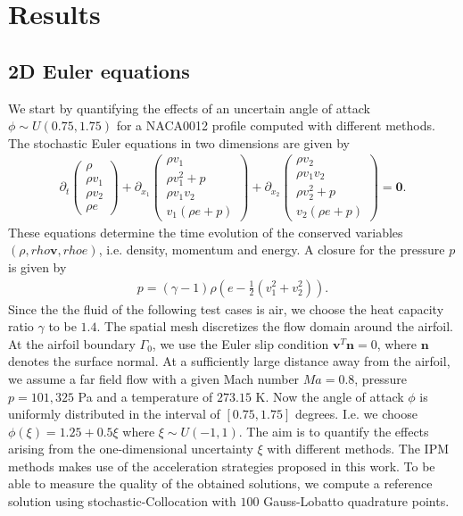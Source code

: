 \section{Results}
\label{sec:results}

\subsection{2D Euler equations}
We start by quantifying the effects of an uncertain angle of attack $\phi\sim U(0.75,1.75)$ for a NACA0012 profile computed with different methods. The stochastic Euler equations in two dimensions are given by
\begin{align*}
\partial_t
\begin{pmatrix}
\rho \\ \rho v_1 \\ \rho v_2 \\ \rho e
\end{pmatrix}
+\partial_{x_1}
\begin{pmatrix}
\rho v_1 \\ \rho v_1^2 +p \\ \rho v_1 v_2 \\  v_1 (\rho e+p)
\end{pmatrix}
+\partial_{x_2}
\begin{pmatrix}
\rho v_2 \\ \rho v_1 v_2 \\ \rho v_2^2+p \\ v_2 (\rho e+p)
\end{pmatrix}
=\bm{0}.
\end{align*}
These equations determine the time evolution of the conserved variables $(\rho,rho \bm v, rho e)$, i.e. density, momentum and energy. A closure for the pressure $p$ is given by
\begin{align*}
p = (\gamma-1)\rho\left(e-\frac12(v_1^2+v_2^2)\right).
\end{align*}
Since the the fluid of the following test cases is air, we choose the heat capacity ratio $\gamma$ to be $1.4$. The spatial mesh discretizes the flow domain around the airfoil. At the airfoil boundary $\Gamma_{0}$, we use the Euler slip condition $\bm v^T\bm n = 0$, where $\bm n$ denotes the surface normal. At a sufficiently large distance away from the airfoil, we assume a far field flow with a given Mach number $Ma = 0.8$, pressure $p = 101,325$ Pa and a temperature of $273.15$ K. Now the angle of attack $\phi$ is uniformly distributed in the interval of $[0.75,1.75]$ degrees. I.e. we choose $\phi(\xi) = 1.25 + 0.5\xi$ where $\xi\sim U(-1,1)$.
The aim is to quantify the effects arising from the one-dimensional uncertainty $\xi$ with different methods. The IPM methods makes use of the acceleration strategies proposed in this work. To be able to measure the quality of the obtained solutions, we compute a reference solution using stochastic-Collocation with $100$ Gauss-Lobatto quadrature points.

